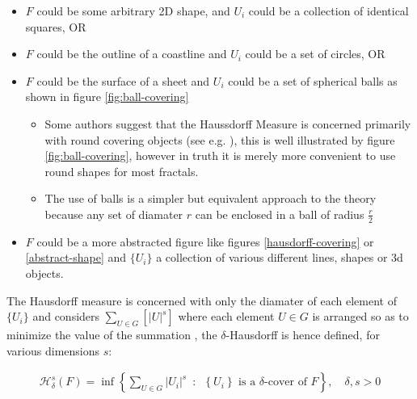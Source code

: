 \documentclass[a4paper,11pt,twoside]{article}
\begin{document}
\begin{itemize}
\item \(F\) could be some arbitrary 2D shape, and \(U_{i}\) could be
a collection of identical squares, OR

\item \(F\) could be the outline of a coastline and \(U_{i}\) could be a set of circles, OR

\item \(F\) could be the surface of a sheet and \(U_{i}\) could be a set of spherical balls as shown in figure \ref{fig:ball-covering}

\begin{itemize}
\item Some authors suggest that the Haussdorff Measure is concerned primarily with round covering objects (see e.g. \cite{sandersonFractalsAreTypically2017}), this is well illustrated by figure \ref{fig:ball-covering}, however in truth it is merely more convenient to use round shapes for most fractals.

\item The use of balls is a simpler but equivalent approach to the theory \cite[ ]{falconerFractalGeometryMathematical2003b} because any set of diamater \(r\) can be enclosed in a ball of radius \(\frac{r}{2}\) \cite[p. 166]{edgarMeasureTopologyFractal2008}
\end{itemize}

\item \(F\) could be a more abstracted figure like figures \ref{hausdorff-covering} or \ref{abstract-shape}  and \(\{U_{i}\}\) a collection of various different lines, shapes or 3d objects.
\end{itemize}

The Hausdorff measure is concerned with only the diamater of each element of \(\{U_{i}\}\) and considers \(\sum_{U \in G} \left[\left\lvert U\right\rvert^{s}\right]\) where each element \(U\in G\) is arranged so as to minimize the value of the summation \cite[p. 27]{falconerFractalGeometryMathematical2003b}
, the \(\delta\)-Hausdorff is hence defined, for various dimensions \(s\):

\begin{align}
\mathcal{H}^s_{\delta}\left( F \right)= \inf \left\{ \sum_{U\in G}   \left\lvert U_i \right\rvert^s \enspace : \enspace  \left\{U_i\right\} \text{ is a } \delta \text{-cover of } F \right\}, \quad \delta, s > 0 \label{eq:delta-measure}
\end{align}
\end{document}
